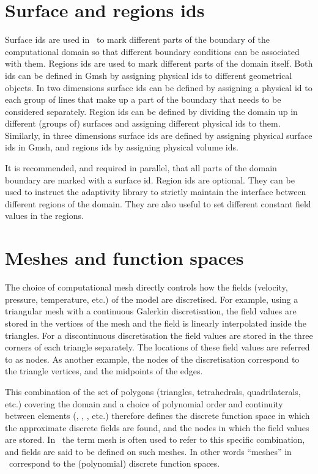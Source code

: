 \section{Surface and regions ids}
\label{sec:surface_and_region_ids}
Surface ids are used in \fluidity\ to mark different parts of the boundary of the
computational domain so that different boundary conditions can be associated
with them. Regions ids are used to mark different parts of the domain itself.
Both ids can be defined in Gmsh by assigning physical ids to different
geometrical objects. In two dimensions surface ids can be defined by assigning a
physical id to each group of lines that make up a part of the boundary that
needs to be considered separately. Region ids can be defined by dividing the
domain up in different (groups of) surfaces and assigning different 
physical ids to them. Similarly, in three dimensions surface ids are defined by
assigning physical surface ids in Gmsh, and regions ids by assigning physical
volume ids.

It is recommended, and required in parallel, that all parts of the domain
boundary are marked with a surface id. Region ids are optional. They can be used
to instruct the adaptivity library to strictly maintain the interface between 
different regions of the domain. They are also useful to set different constant 
field values in the regions.

\section{Meshes and function spaces}
\label{sec:meshes_and_function_spaces}
The choice of computational mesh directly controls how the fields (velocity,
pressure, temperature, etc.) of the model are discretised. For example, using a
triangular mesh with a \Pone continuous Galerkin discretisation, the field
values are stored in the vertices of the mesh and the field is linearly
interpolated inside the triangles. For a discontinuous \PoDG discretisation the
field values are stored in the three corners of each triangle separately. The
locations of these field values are referred to as nodes. As another example, the
nodes of the \Ptwo discretisation correspond to the triangle vertices, and the
midpoints of the edges.

This combination of the set of polygons (triangles, tetrahedrals, 
quadrilaterals, etc.) covering the domain 
and a choice of polynomial order and continuity between
elements (\Pone, \PoDG, \Ptwo, etc.) therefore defines the discrete function 
space in which the approximate discrete fields are found, and the nodes
in which the field values are stored. In \fluidity\ 
the term mesh is often used to refer to this specific combination, and fields are said
to be defined on such meshes. In other words ``meshes'' in \fluidity\ correspond
to the (polynomial) discrete function spaces.

